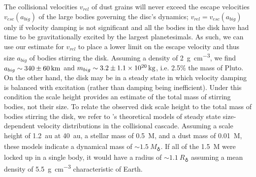 \documentclass[modern]{aastex62}
\begin{document}
The collisional velocities $v_{rel}$ of dust grains will never exceed the escape velocities $v_{esc}(a_{big})$ of the large bodies governing the disc's dynamics; $v_{rel} = v_{esc}(a_{big})$ only if velocity damping is not significant and all the bodies in the disk have had time to be gravitationally excited by the largest planetesimals. 
As such, we can use our estimate for $v_{rel}$ to place a lower limit on the escape velocity and thus size $a_{big}$ of bodies stirring the disk.
Assuming a density of \SI{2}{\g.\cm^{-3}}, we find $a_{big} \sim \SI{340 \pm 60}{km}$ and $m_{big} \sim \SI{3.2 \pm 1.1e20}{kg}$, i.e. 2.5\% the mass of Pluto.
On the other hand, the disk may be in a steady state in which velocity damping is balanced with excitation (rather than damping being inefficient).
Under this condition the scale height provides an estimate of the total mass of stirring bodies, not their size.
To relate the observed disk scale height to the total mass of bodies stirring the disk, we refer to \cite{pan&schlichting12}'s theoretical models of steady state size-dependent velocity distributions in the collisional cascade.
Assuming a scale height of \SI{1.2}{au} at \SI{40}{au}, a stellar mass of \SI{0.5}{M_\sun}, and a dust mass of \SI{0.01}{M_\earth}, these models indicate a dynamical mass of $\sim\SI{1.5}{M_\earth}$.
If all of the \SI{1.5}{M_\earth} were locked up in a single body, it would have a radius of $\sim \SI{1.1}{R_\earth}$ assuming a mean density of \SI{5.5}{\g.\cm^{-3}} characteristic of Earth.
\end{document}

